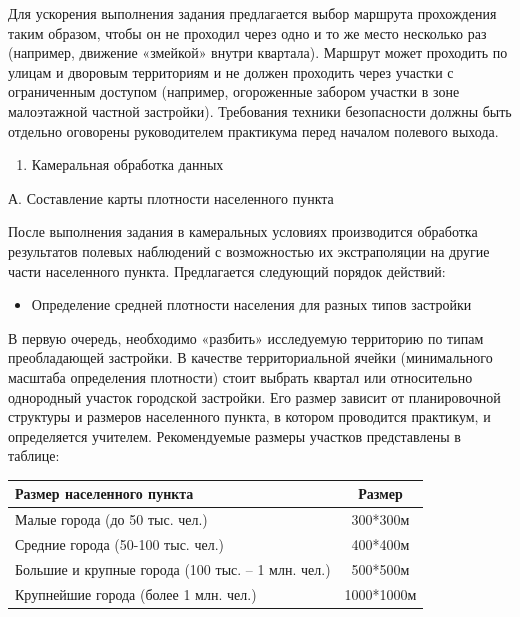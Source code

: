 \documentclass[
  11pt,
]{book}
\providecommand{\tightlist}{%
  \setlength{\itemsep}{0pt}\setlength{\parskip}{0pt}}
\begin{document}
Для ускорения выполнения задания предлагается выбор маршрута прохождения таким образом, чтобы он не проходил через одно и то же место несколько раз (например, движение «змейкой» внутри квартала). Маршрут может проходить по улицам и дворовым территориям и не должен проходить через участки с ограниченным доступом (например, огороженные забором участки в зоне малоэтажной частной застройки). Требования техники безопасности должны быть отдельно оговорены руководителем практикума перед началом полевого выхода.

\begin{enumerate}
\def\labelenumi{\arabic{enumi}.}
\setcounter{enumi}{2}
\tightlist
\item
  Камеральная обработка данных
\end{enumerate}

А. Составление карты плотности населенного пункта

После выполнения задания в камеральных условиях производится обработка результатов полевых наблюдений с возможностью их экстраполяции на другие части населенного пункта. Предлагается следующий порядок действий:

\begin{itemize}
\tightlist
\item
  Определение средней плотности населения для разных типов застройки
\end{itemize}

В первую очередь, необходимо «разбить» исследуемую территорию по типам преобладающей застройки. В качестве территориальной ячейки (минимального масштаба определения плотности) стоит выбрать квартал или относительно однородный участок городской застройки. Его размер зависит от планировочной структуры и размеров населенного пункта, в котором проводится практикум, и определяется учителем. Рекомендуемые размеры участков представлены в таблице:

\begin{longtable}[]{@{}lc@{}}
\toprule\noalign{}
Размер населенного пункта & Размер \\
\midrule\noalign{}
\endhead
\bottomrule\noalign{}
\endlastfoot
Малые города (до 50 тыс. чел.) & 300*300м \\
Средние города (50-100 тыс. чел.) & 400*400м \\
Большие и крупные города (100 тыс. -- 1 млн. чел.) & 500*500м \\
Крупнейшие города (более 1 млн. чел.) & 1000*1000м \\
\end{longtable}
\end{document}
